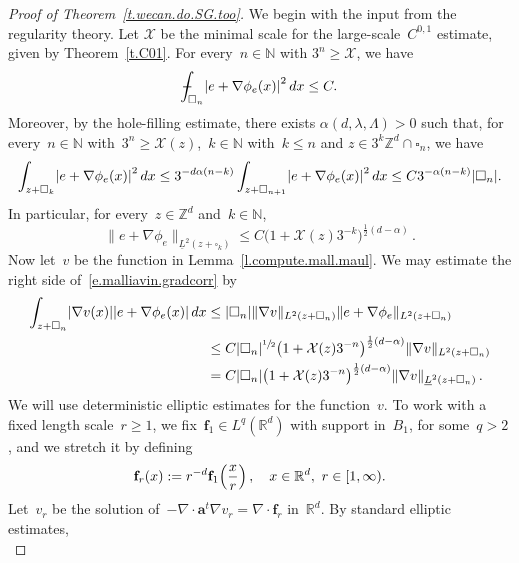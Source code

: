 \documentclass[11pt]{article} %
\let\oldsquare\square %
\renewcommand{\square}{\oldsquare}
\numberwithin{equation}{section}
\theoremstyle{definition}
\let\originalleft\left
\let\originalright\right
\renewcommand{\left}{\mathopen{}\mathclose\bgroup\originalleft}
\renewcommand{\right}{\aftergroup\egroup\originalright}
\newcommand*{\N}{\ensuremath{\mathbb{N}}}
\newcommand*{\Zd}{\ensuremath{\mathbb{Z}^d}}
\newcommand*{\Rd}{\ensuremath{\mathbb{R}^d}}
\newcommand{\f}{\mathbf{f}}
\renewcommand{\a}{\mathbf{a}}
\newcommand{\cu}{\square}
\newcommand{\X}{\mathcal{X}}
\def\Xint#1{\mathchoice
{\XXint\displaystyle\textstyle{#1}}%
{\XXint\textstyle\scriptstyle{#1}}%
{\XXint\scriptstyle\scriptscriptstyle{#1}}%
{\XXint\scriptscriptstyle\scriptscriptstyle{#1}}%
\!\int}
\def\XXint#1#2#3{{\setbox0=\hbox{$#1{#2#3}{\int}$}
\vcenter{\hbox{$#2#3$}}\kern-.5\wd0}}
\def\fint{\Xint-}
\begin{document}
\begin{proof}[{Proof of Theorem~\ref{t.wecan.do.SG.too}}]
We begin with the input from the regularity theory. Let $\X$ be the minimal scale for the large-scale~$C^{0,1}$ estimate, given by Theorem~\ref{t.C01}. 
For every~$n\in\N$ with $3^n \geq \X$, we have 
\begin{equation}
\fint_{\cu_n} \left| e+ \nabla \phi_e(x) \right|^2\,dx
\leq 
C.
\end{equation}
Moreover, by the hole-filling estimate, there exists $\alpha(d,\lambda,\Lambda)>0$ such that, for every~$n\in\N$ with~$3^n\geq \X(z)$,~$k\in\N$ with~$k\leq n$ and $z\in 3^k\Zd\cap\cu_n$, we have
\begin{equation}
\int_{z+\cu_k} 
\left| e+ \nabla \phi_e(x) \right|^2\,dx
\leq 
3^{-d\alpha(n-k)}
\int_{z+\cu_{n+1}}  \left| e+ \nabla \phi_e(x) \right|^2\,dx
\leq 
C 3^{-\alpha(n-k)} \left| \cu_n \right|.
\end{equation}
In particular, for every~$z\in\Zd$ and~$k\in\N$, 
\begin{equation*}
\| e + \nabla \phi_e \|_{\underline{L}^2(z+\cu_k)}
\leq 
C \bigl( 1+ \X(z) 3^{-k} \bigr)^{\frac12(d-\alpha)}
\,.
\end{equation*}
Now let~$v$ be the function in Lemma~\ref{l.compute.mall.maul}. 
We may estimate the right side of~\eqref{e.malliavin.gradcorr} by 
\begin{align}
\label{e.thisisverydifficult}
\int_{z+\cu_n}
\left| \nabla v(x) \right| \left|e+ \nabla \phi_e(x) \right|\,dx
&
\leq 
| \cu_n | 
\| \nabla v \|_{{L}^2(z+\cu_n)} \| e+\nabla \phi_e \|_{{L}^2(z+\cu_n)}
\notag \\ &
\leq 
C |\cu_n|^{\sfrac12} \bigl(1+\X(z) 3^{-n} \bigr)^{\frac12(d-\alpha)}
\| \nabla v \|_{{L}^2(z+\cu_n)} 
\notag \\ &
= 
C |\cu_n| \bigl(1+\X(z) 3^{-n} \bigr)^{\frac12(d-\alpha)}
\| \nabla v \|_{\underline{L}^2(z+\cu_n)} 
\,.
\end{align}
We will use deterministic elliptic estimates for the function~$v$.  
To work with a fixed length scale~$r\geq 1$, we fix~$\f_1\in L^{q}(\Rd)$ with support in~$B_1$, for some~$q>2$, and we stretch it by defining
\begin{equation}
\label{e.fr.LSI}
\f_r(x):=  r^{-d} \f_1 \Bigl( \frac xr \Bigr)\,, 
\quad x\in\Rd, \  r\in [1,\infty). 
\end{equation}
Let~$v_r$ be the solution of~$-\nabla \cdot \a^t \nabla v_r = \nabla \cdot \f_r$ in~$\Rd$. By standard elliptic estimates, 
\begin{equation*}

\end{equation*}
\end{proof}
\end{document}
